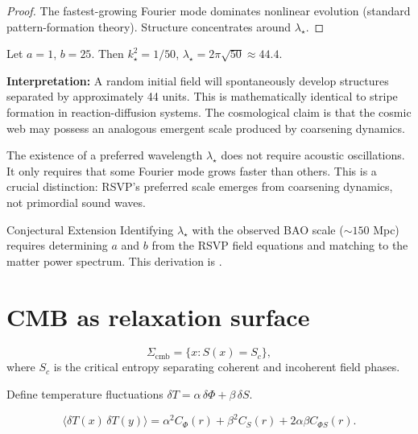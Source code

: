 \begin{proof}
  The fastest-growing Fourier mode dominates nonlinear evolution
  (standard pattern-formation theory).
  Structure concentrates around $\lambda_\star$.
\end{proof}

\begin{WorkedExample}
  Let $a = 1$, $b = 25$.
  Then
  $k_\star^2 = 1/50$,
  $\lambda_\star = 2\pi\sqrt{50} \approx 44.4$.

  \textbf{Interpretation:} A random initial field will
  spontaneously develop structures separated by approximately
  44 units.
  This is mathematically identical to stripe formation in
  reaction-diffusion systems.
  The cosmological claim is that the cosmic web may possess an
  analogous emergent scale produced by coarsening dynamics.
\end{WorkedExample}

\begin{TechNote}
  The existence of a preferred wavelength $\lambda_\star$ does
  not require acoustic oscillations.
  It only requires that some Fourier mode grows faster than
  others.
  This is a crucial distinction: RSVP's preferred scale emerges
  from coarsening dynamics, not primordial sound waves.
\end{TechNote}

\begin{StatusBox}{Conjectural Extension}
  Identifying $\lambda_\star$ with the observed BAO scale
  ($\sim 150$ Mpc) requires determining $a$ and $b$ from the
  RSVP field equations and matching to the matter power spectrum.
  This derivation is \statusopen{}.
\end{StatusBox}

\section{CMB as relaxation surface}

\begin{definition}
  \[
    \Sigma_{\mathrm{cmb}} = \{x : S(x) = S_c\},
  \]
  where $S_c$ is the critical entropy separating coherent and
  incoherent field phases.
\end{definition}

Define temperature fluctuations
$\delta T = \alpha\,\delta\Phi + \beta\,\delta S$.

\begin{proposition}
  \label{prop:cmb-correlations}
  \statusproven{}
  \[
    \langle\delta T(x)\,\delta T(y)\rangle
    = \alpha^2 C_\Phi(r) + \beta^2 C_S(r)
    + 2\alpha\beta C_{\Phi S}(r).
  \]
\end{proposition}

